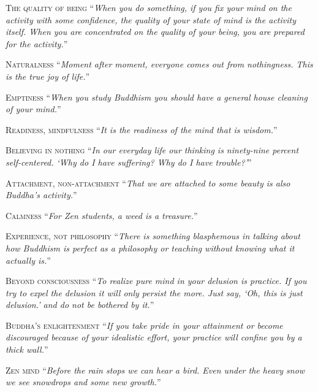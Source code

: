 \documentclass[14pt]{extarticle}
\newcommand{\aphor}[3]{
    \lettrine[lines=2, lraise=0.15]{#1}{#2}
    \enquote{\textit{#3}}
}
\begin{document}
\aphor{T}{he quality of being} {When you do something, if you fix your mind on the activity with some confidence, the quality of your state of mind is the activity itself. When you are concentrated on the quality of your being, you are prepared for the activity.}

\pagebreak

\aphor{N}{aturalness} {Moment after moment, everyone comes out from nothingness. This is the true joy of life.}

\aphor{E}{mptiness} {When you study Buddhism you should have a general house cleaning of your mind.}

\aphor{R}{eadiness, mindfulness} {It is the readiness of the mind that is wisdom.}

\aphor{B}{elieving in nothing} {In our everyday life our thinking is ninety-nine percent self-centered. \enquote{Why do I have suffering? Why do I have trouble?}}

\aphor{A}{ttachment, non-attachment} {That we are attached to some beauty is also Buddha's activity.}

\aphor{C}{almness} {For Zen students, a weed is a treasure.}

\aphor{E}{xperience, not philosophy} {There is something blasphemous in talking about how Buddhism is perfect as a philosophy or teaching without knowing what it actually is.}

\aphor{B}{eyond consciousness} {To realize pure mind in your delusion is practice. If you try to expel the delusion it will only persist the more. Just say, \enquote{Oh, this is just delusion.} and do not be bothered by it.}

\aphor{B}{uddha's enlightenment} {If you take pride in your attainment or become discouraged because of your idealistic effort, your practice will confine you by a thick wall.}

\aphor{Z}{en mind} {Before the rain stops we can hear a bird. Even under the heavy snow we see snowdrops and some new growth.}
\end{document}
